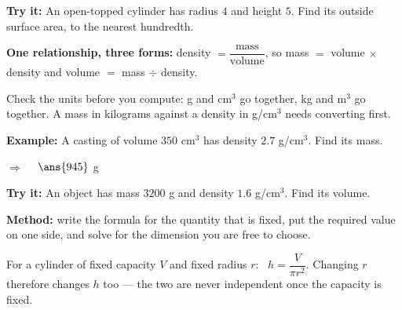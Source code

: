 \documentclass[12pt]{article}
\begin{document}
\begin{tryitbox}
\textbf{Try it:} \quad An open-topped cylinder has radius $4$ and height $5$. Find its outside surface area, to the nearest hundredth.\\[2pt]
\end{tryitbox}


\begin{formulabox}
\textbf{One relationship, three forms:} density $= \dfrac{\text{mass}}{\text{volume}}$, so mass $=$ volume $\times$ density and volume $=$ mass $\div$ density.\par
Check the units before you compute: g and cm$^3$ go together, kg and m$^3$ go together. A mass in kilograms against a density in g/cm$^3$ needs converting first.
\end{formulabox}

\begin{examplebox}
\textbf{Example:} \quad A casting of volume $350$ cm$^3$ has density $2.7$ g/cm$^3$. Find its mass.

$\Rightarrow\quad$ $\ans{945}$ g
\end{examplebox}

\begin{tryitbox}
\textbf{Try it:} \quad An object has mass $3200$ g and density $1.6$ g/cm$^3$. Find its volume.\\[2pt]
\end{tryitbox}


\begin{formulabox}
\textbf{Method:} write the formula for the quantity that is fixed, put the required value on one side, and solve for the dimension you are free to choose.\par
For a cylinder of fixed capacity $V$ and fixed radius $r$: \ $h = \dfrac{V}{\pi r^2}$. Changing $r$ therefore changes $h$ too --- the two are never independent once the capacity is fixed.
\end{formulabox}
\end{document}
